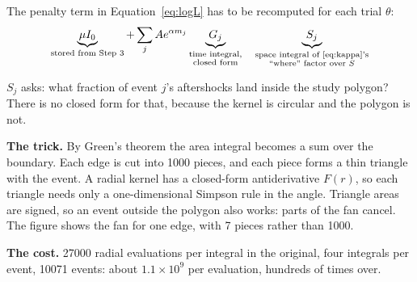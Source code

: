 \documentclass[11pt,a4paper]{article}
\begin{document}
The penalty term in Equation~\eqref{eq:logL} has to be recomputed for each trial $\theta$:
\begin{equation}
  \underbrace{\mu I_0}_{\text{stored from Step 3}}
  + \sum_{j} A e^{\alpha m_j}
  \underbrace{G_j}_{\substack{\text{time integral,}\\\text{closed form}}}
  \quad\underbrace{S_j}_{\substack{\text{space integral of \eqref{eq:kappa}'s}\\\text{``where'' factor over $S$}}}
\end{equation}

$S_j$ asks: what fraction of event $j$'s aftershocks land inside the study polygon? There is no
closed form for that, because the kernel is circular and the polygon is not.


\begin{minipage}[t]{.47\linewidth}
\vspace{0pt}\centering
{}
\end{minipage}\hfill
\begin{minipage}[t]{.5\linewidth}
\vspace{4pt}
\textbf{The trick.} By Green's theorem the area integral becomes a sum over the boundary. Each
edge is cut into 1000 pieces, and each piece forms a thin triangle with the event. A radial
kernel has a closed-form antiderivative $F(r)$, so each triangle needs only a one-dimensional
Simpson rule in the angle. Triangle areas are signed, so an event outside the polygon also works:
parts of the fan cancel. The figure shows the fan for one edge, with 7 pieces rather than 1000.

\smallskip
\textbf{The cost.} 27000 radial evaluations per integral in the original, four integrals per
event, 10071 events: about $1.1\times10^9$ per evaluation, hundreds of times over.
\end{minipage}
\end{document}
